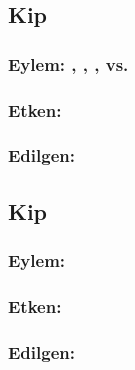 \subsection*{Kip }
\subsubsection*{Eylem: , , , vs.}
\subsubsection*{Etken: }
\subsubsection*{Edilgen: }


\subsection*{Kip }

\subsubsection*{Eylem: }
\subsubsection*{Etken: }
\subsubsection*{Edilgen: }


